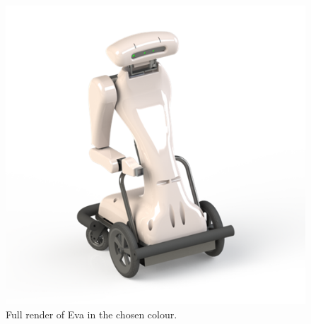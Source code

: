 \documentclass[technical_document.tex]{subfiles}
\begin{document}
\begin{figure}[h]
	\centering
	\mbox{\includegraphics[width=1\textwidth]{Images/SW_fullrender.png}}
	\caption{Full render of Eva in the chosen colour.}
	\label{fig:sw_fullrender}
\end{figure}
\end{document}

